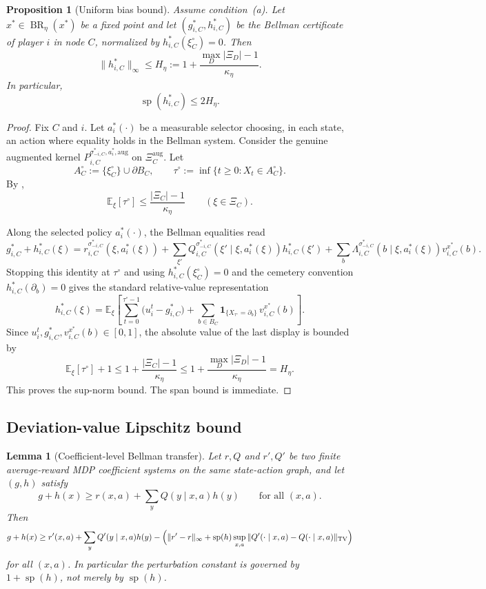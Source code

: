 \documentclass[12pt]{article}
\newtheorem{proposition}[theorem]{Proposition}
\newtheorem{lemma}[theorem]{Lemma}
\theoremstyle{definition}
\newcommand{\E}{\mathbb{E}}
\newcommand{\1}{\mathbf{1}}
\DeclareMathOperator{\spn}{sp}
\DeclareMathOperator{\BR}{BR}
\begin{document}
\begin{proposition}[Uniform bias bound]
\label{prop:bias-span}
Assume condition~\textnormal{(a)}. Let $x^*\in\BR_\eta(x^*)$ be a fixed point and
let $(g_{i,C}^*,h_{i,C}^*)$ be the Bellman certificate of player $i$ in node $C$,
normalized by $h_{i,C}^*(\xi_C^\circ)=0$. Then
\[
\|h_{i,C}^*\|_\infty\le H_\eta:=1+\frac{\max_D|\Xi_D|-1}{\kappa_\eta}.
\]
In particular,
\[
\spn(h_{i,C}^*)\le 2H_\eta.
\]
\end{proposition}

\begin{proof}
Fix $C$ and $i$. Let $a_i^*(\cdot)$ be a measurable selector choosing, in each
state, an action where equality holds in the Bellman system. Consider the genuine
augmented kernel
$P_{i,C}^{\sigma_{-i,C}^*,a_i^*,\mathrm{aug}}$ on
$\Xi_C^{\mathrm{aug}}$. Let
\[
A_C^\circ:=\{\xi_C^\circ\}\cup\partial B_C,
\qquad
\tau^\circ:=\inf\{t\ge 0:X_t\in A_C^\circ\}.
\]
By ,
\[
\E_\xi[\tau^\circ]\le \frac{|\Xi_C|-1}{\kappa_\eta}
\qquad (\xi\in\Xi_C).
\]

Along the selected policy $a_i^*(\cdot)$, the Bellman equalities read
\[
g_{i,C}^*+h_{i,C}^*(\xi)
=
r_{i,C}^{\sigma_{-i,C}^*}(\xi,a_i^*(\xi))
+
\sum_{\xi'}Q_{i,C}^{\sigma_{-i,C}^*}(\xi'\mid\xi,a_i^*(\xi))h_{i,C}^*(\xi')
+
\sum_b\Lambda_{i,C}^{\sigma_{-i,C}^*}(b\mid\xi,a_i^*(\xi))v_{i,C}^{x^*}(b).
\]
Stopping this identity at $\tau^\circ$ and using $h_{i,C}^*(\xi_C^\circ)=0$ and
the cemetery convention $h_{i,C}^*(\partial_b)=0$ gives the standard relative-value
representation
\[
h_{i,C}^*(\xi)
=
\E_\xi\!\left[
\sum_{t=0}^{\tau^\circ-1}\bigl(u_i^t-g_{i,C}^*\bigr)
+
\sum_{b\in B_C}\1_{\{X_{\tau^\circ}=\partial_b\}}\,v_{i,C}^{x^*}(b)
\right].
\]
Since $u_i^t,g_{i,C}^*,v_{i,C}^{x^*}(b)\in[0,1]$, the absolute value of the last
display is bounded by
\[
\E_\xi[\tau^\circ] + 1
\le
1+\frac{|\Xi_C|-1}{\kappa_\eta}
\le
1+\frac{\max_D|\Xi_D|-1}{\kappa_\eta}
=
H_\eta.
\]
This proves the sup-norm bound. The span bound is immediate.
\end{proof}

\subsection{Deviation-value Lipschitz bound}

\begin{lemma}[Coefficient-level Bellman transfer]
\label{lem:coefficient-transfer}
Let $r,Q$ and $r',Q'$ be two finite average-reward MDP coefficient systems on the
same state-action graph, and let $(g,h)$ satisfy
\[
g+h(x)\ge r(x,a)+\sum_y Q(y\mid x,a)h(y)
\qquad\text{for all }(x,a).
\]
Then
\[
g+h(x)
\ge
r'(x,a)+\sum_y Q'(y\mid x,a)h(y)
-\Bigl(\|r'-r\|_\infty + \spn(h)\sup_{x,a}\|Q'(\cdot\mid x,a)-Q(\cdot\mid x,a)\|_{\mathrm{TV}}\Bigr)
\]
for all $(x,a)$. In particular the perturbation constant is governed by
$1+\spn(h)$, not merely by $\spn(h)$.
\end{lemma}
\end{document}
